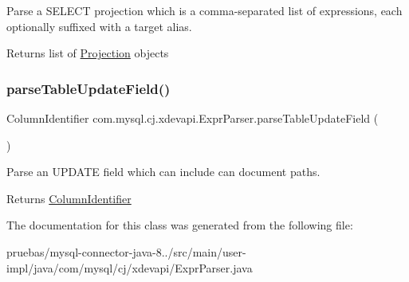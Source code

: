 Parse a S\+E\+L\+E\+CT projection which is a comma-\/separated list of expressions, each optionally suffixed with a target alias.

\begin{DoxyReturn}{Returns}
list of \mbox{\hyperlink{}{Projection}} objects 
\end{DoxyReturn}
\mbox{\label{classcom_1_1mysql_1_1cj_1_1xdevapi_1_1_expr_parser_ab2e27d666920b2b5e2985b98a7c658d7}} 
\subsubsection{\texorpdfstring{parse\+Table\+Update\+Field()}{parseTableUpdateField()}}
{\footnotesize\ttfamily Column\+Identifier com.\+mysql.\+cj.\+xdevapi.\+Expr\+Parser.\+parse\+Table\+Update\+Field (\begin{DoxyParamCaption}{ }\end{DoxyParamCaption})}

Parse an U\+P\+D\+A\+TE field which can include can document paths.

\begin{DoxyReturn}{Returns}
\mbox{\hyperlink{}{Column\+Identifier}} 
\end{DoxyReturn}


The documentation for this class was generated from the following file\+:\begin{DoxyCompactItemize}
\item 
pruebas/mysql-\/connector-\/java-\/8../src/main/user-\/impl/java/com/mysql/cj/xdevapi/Expr\+Parser.\+java\end{DoxyCompactItemize}
